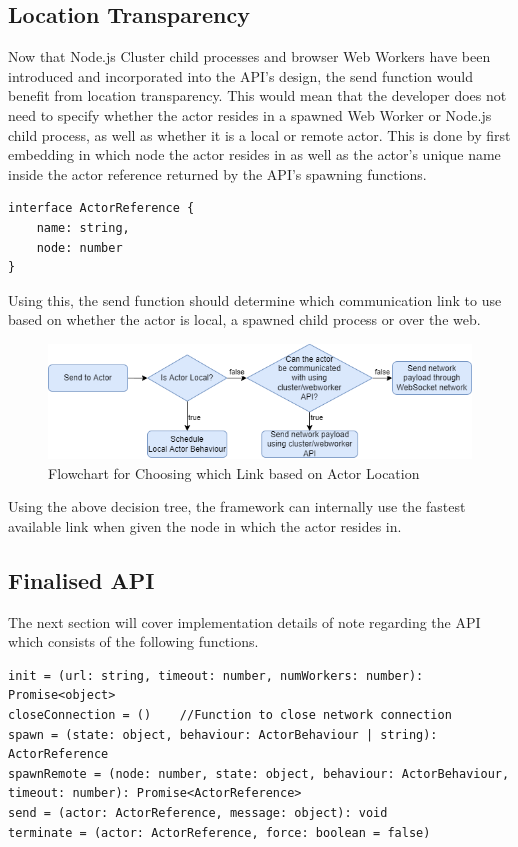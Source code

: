 \documentclass[12pt, a4paper]{report}
\theoremstyle{definition}
\theoremstyle{definition}%
\theoremstyle{definition}%
\theoremstyle{definition}%
\theoremstyle{definition}%
\theoremstyle{definition}%
\begin{document}
\subsection{Location Transparency}
Now that Node.js Cluster child processes and browser Web Workers have been introduced and incorporated into the API's design, the send function would benefit from location transparency. This would mean that the developer does not need to specify whether the actor resides in a spawned Web Worker or Node.js child process, as well as whether it is a local or remote actor. This is done by first embedding in which node the actor resides in as well as the actor's unique name inside the actor reference returned by the API's spawning functions.
\begin{lstlisting}
interface ActorReference {
    name: string,
    node: number
}
\end{lstlisting}
Using this, the send function should determine which communication link to use based on whether the actor is local, a spawned child process or over the web.
\begin{figure}[H]
    \begin{centering}
        \includegraphics[width=\textwidth]{resources/communication.png}
        \caption{Flowchart for Choosing which Link based on Actor Location}
    \end{centering}
\end{figure}
Using the above decision tree, the framework can internally use the fastest available link when given the node in which the actor resides in.
\subsection{Finalised API}
The next section will cover implementation details of note regarding the API which consists of the following functions.
\begin{lstlisting}
init = (url: string, timeout: number, numWorkers: number): Promise<object>
closeConnection = ()    //Function to close network connection
spawn = (state: object, behaviour: ActorBehaviour | string): ActorReference
spawnRemote = (node: number, state: object, behaviour: ActorBehaviour, timeout: number): Promise<ActorReference>
send = (actor: ActorReference, message: object): void
terminate = (actor: ActorReference, force: boolean = false)
\end{lstlisting}
\end{document}
